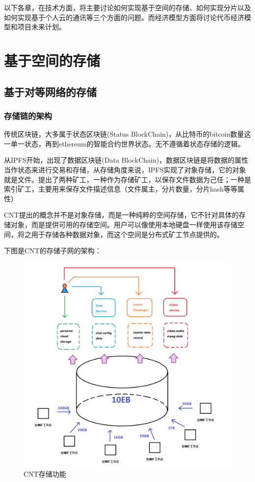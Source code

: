 \documentclass[a4paper,12pt]{article}
\begin{document}
以下各章，在技术方面，将主要讨论如何实现基于空间的存储、如何实现分片以及如何实现基于个人云的通讯等三个方面的问题。而经济模型方面将讨论代币经济模型和项目未来计划。

\section{基于空间的存储}
\subsection{基于对等网络的存储}
\subsubsection{存储链的架构}

传统区块链，大多属于状态区块链(Status BlockChain)，从比特币的bitcoin数量这一单一状态，再到ethereum的智能合约世界状态。无不遵循着状态存储的逻辑。

从IPFS开始，出现了数据区块链(Data BlockChain)，数据区块链是将数据的属性当作状态来进行交易和存储，从存储角度来说，IPFS实现了对象存储，它的对象就是文件。提出了两种矿工，一种作为存储矿工，以保存文件数据为己任；一种是索引矿工，主要用来保存文件描述信息（文件属主，分片数量，分片hash等等属性）

CNT提出的概念并不是对象存储，而是一种纯粹的空间存储，它不针对具体的存储对象，而是提供可用的存储空间。用户可以像使用本地硬盘一样使用该存储空间，将之用于存储各种数据对象，而这个空间是分布式矿工节点提供的。

下图是CNT的存储子网的架构：

\renewcommand\figurename{图}

\begin {figure} [htbp]
\centering \includegraphics [width = 4.5in] {pic_cn/storage.png}
\caption {CNT存储功能} \label {fig: storage}
\end {figure}
\end{document}
